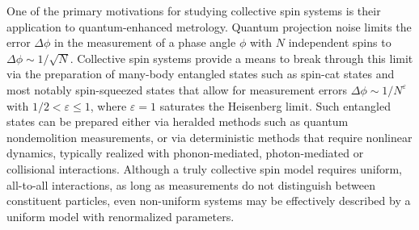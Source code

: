 \documentclass[aps,pra,twocolumn,longbibliography]{revtex4-2}
\newcommand{\1}{\mathds{1}}
\begin{document}
One of the primary motivations for studying collective spin systems is
their application to quantum-enhanced metrology.  Quantum projection
noise limits the error $\Delta\phi$ in the measurement of a phase
angle $\phi$ with $N$ independent spins to
$\Delta\phi\sim1/\sqrt{N}$\cite{wineland1992spin, itano1993quantum}.
Collective spin systems provide a means to break through this limit
via the preparation of many-body entangled states such as spin-cat
states\cite{agarwal1997atomic, lau2014proposal, huang2015quantum} and
most notably spin-squeezed states\cite{wineland1992spin,
  kitagawa1993squeezed, ma2011quantum} that allow for measurement
errors $\Delta\phi\sim1/N^\varepsilon$ with $1/2<\varepsilon\le1$,
where $\varepsilon=1$ saturates the Heisenberg
limit\cite{zwierz2010general}.  Such entangled states can be prepared
either via heralded methods such as quantum nondemolition
measurements\cite{takano2009spin, appel2009mesoscopic,
  schleier-smith2010states, chen2011conditional}, or via deterministic
methods that require nonlinear dynamics, typically realized with
phonon-mediated\cite{bohnet2016quantum},
photon-mediated\cite{leroux2010implementation, bohnet2014reduced,
  cox2016deterministic, hosten2016measurement,
  norcia2018cavitymediated} or collisional\cite{esteve2008squeezing,
  riedel2010atomchipbased, gross2010nonlinear, bromley2018dynamics}
interactions.  Although a truly collective spin model requires
uniform, all-to-all interactions, as long as measurements do not
distinguish between constituent particles, even non-uniform systems
may be effectively described by a uniform model with renormalized
parameters\cite{hu2015entangled}.
\end{document}
